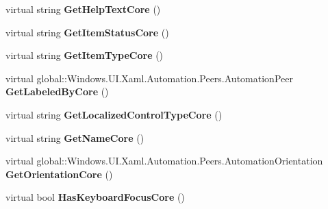 \begin{DoxyCompactItemize}
virtual string {\bfseries Get\+Help\+Text\+Core} ()
\item 
\mbox{\label{class_windows_1_1_u_i_1_1_xaml_1_1_automation_1_1_peers_1_1_automation_peer_a7531b623b14754b9f333f073e787370c}} 
virtual string {\bfseries Get\+Item\+Status\+Core} ()
\item 
\mbox{\label{class_windows_1_1_u_i_1_1_xaml_1_1_automation_1_1_peers_1_1_automation_peer_ab7e73605b4d6af50ce1e8d3be13f718c}} 
virtual string {\bfseries Get\+Item\+Type\+Core} ()
\item 
\mbox{\label{class_windows_1_1_u_i_1_1_xaml_1_1_automation_1_1_peers_1_1_automation_peer_a7b381b450ce7bad769a25c534aecc3a7}} 
virtual global\+::\+Windows.\+U\+I.\+Xaml.\+Automation.\+Peers.\+Automation\+Peer {\bfseries Get\+Labeled\+By\+Core} ()
\item 
\mbox{\label{class_windows_1_1_u_i_1_1_xaml_1_1_automation_1_1_peers_1_1_automation_peer_a102feaeb60241a4b90e5215604402a40}} 
virtual string {\bfseries Get\+Localized\+Control\+Type\+Core} ()
\item 
\mbox{\label{class_windows_1_1_u_i_1_1_xaml_1_1_automation_1_1_peers_1_1_automation_peer_ab0c8c7ce6d1a49aca1d7cd572de76b25}} 
virtual string {\bfseries Get\+Name\+Core} ()
\item 
\mbox{\label{class_windows_1_1_u_i_1_1_xaml_1_1_automation_1_1_peers_1_1_automation_peer_a3d35fe79090d43f586705e1a5ee1b8c9}} 
virtual global\+::\+Windows.\+U\+I.\+Xaml.\+Automation.\+Peers.\+Automation\+Orientation {\bfseries Get\+Orientation\+Core} ()
\item 
\mbox{\label{class_windows_1_1_u_i_1_1_xaml_1_1_automation_1_1_peers_1_1_automation_peer_abaf7e76875c95ee1262a4a9500762de0}} 
virtual bool {\bfseries Has\+Keyboard\+Focus\+Core} ()

\end{DoxyCompactItemize}
